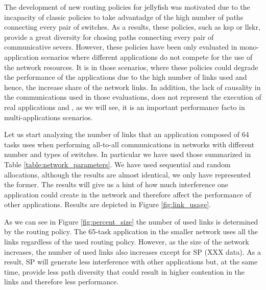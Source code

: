 \documentclass{sig-alternate}
\begin{document}
The development of new routing policies for jellyfish was motivated due to the incapacity of classic policies to take advantadge of the high number of paths connecting every pair of switches. As a results, these policies, such as ksp or llskr, provide a great diversity for chosing paths connecting every pair of communicative severs. However, these policies have been only evaluated in mono-application scenarios where different applications do not compete for the use of the network resources. It is in those scenarios, where these policies could degrade the performance of the applications due to the high number of links used and hence, the increase share of the network links. In addition, the lack of causality in the communications used in those evaluations, does not represent the execution of real applications and , as we will see, it is an important performance facto in multi-applications scenarios.

Let us start analyzing the number of links that an application composed of 64 tasks uses when performing all-to-all communications in networks with different number and types of switches. In particular we have used those summarized in Table \ref{table:network_parameters}. We have used sequential and random allocations, although the results are almost identical, we only have represented the former. The results will give us a hint of how much interference one application could create in the network and therefore affect the performance of other applications. Results are depicted in Figure \ref{fig:link_usage}. 



As we can see in Figure \ref{fig:percent_size} the number of used links is determined by the routing policy. The 65-task application in the smaller network uses all the links regardless of the used routing policy. However, as the size of the network increases, the number of used links also increases except for SP (XXX data). As a result, SP will generate less interference with other applications but, at the same time, provide less path diversity that could result in higher contention in the links and therefore less performance.
\end{document}
